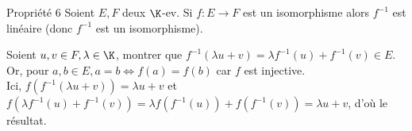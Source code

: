 \documentclass[12pt, a4paper]{report}
\begin{document}
\begin{remarque}{}
\begin{proposition}{Propriété 6}{}
Soient $E,F$ deux $\K$-ev. Si $f : E \longrightarrow F$ est un isomorphisme alors $f^{-1}$ est linéaire  (donc $f^{-1}$ est un isomorphisme).
\end{proposition}

\begin{demo}{}
Soient $u,v \in F, \lambda \in \K$, montrer que $f^{-1}(\lambda u+v) = \lambda f^{-1}(u) + f^{-1}(v) \in E$. \\
Or, pour $a,b \in E, a = b  \Longleftrightarrow f(a) = f(b)$ car $f$ est injective. \\
Ici, $f(f^{-1}(\lambda u + v)) = \lambda u + v$ et $f(\lambda f^{-1}(u) + f^{-1}(v)) = \lambda f(f^{-1}(u)) + f(f^{-1}(v)) = \lambda u + v$, d'où le résultat.
\end{demo}
\end{remarque}
\end{document}
